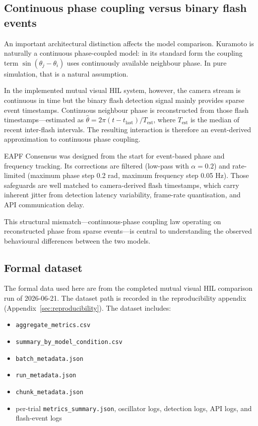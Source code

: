 \documentclass[11pt,a4paper]{article}
\begin{document}
\subsection{Continuous phase coupling versus binary flash events}

An important architectural distinction affects the model comparison. Kuramoto
is naturally a continuous phase-coupled model: in its standard form the
coupling term $\sin(\theta_j - \theta_i)$ uses continuously available
neighbour phase. In pure simulation, that is a natural assumption.

In the implemented mutual visual HIL system, however, the camera stream is
continuous in time but the binary flash detection signal mainly provides sparse
event timestamps. Continuous neighbour phase is reconstructed from those flash
timestamps---estimated as $\hat\theta = 2\pi (t - t_{\mathrm{last}}) /
T_{\mathrm{est}}$, where $T_{\mathrm{est}}$ is the median of recent inter-flash
intervals. The resulting interaction is therefore an event-derived
approximation to continuous phase coupling.

EAPF Consensus was designed from the start for event-based phase and frequency
tracking. Its corrections are filtered (low-pass with $\alpha=0.2$) and
rate-limited (maximum phase step 0.2 rad, maximum frequency step 0.05 Hz).
Those safeguards are well matched to camera-derived flash timestamps, which
carry inherent jitter from detection latency variability, frame-rate
quantisation, and API communication delay.

This structural mismatch---continuous-phase coupling law operating on
reconstructed phase from sparse events---is central to understanding the
observed behavioural differences between the two models.

\subsection{Formal dataset}

The formal data used here are from the completed mutual visual HIL comparison
run of 2026-06-21. The dataset path is recorded in the reproducibility
appendix (Appendix~\ref{sec:reproducibility}). The dataset includes:

\begin{itemize}
  \item \texttt{aggregate\_metrics.csv}
  \item \texttt{summary\_by\_model\_condition.csv}
  \item \texttt{batch\_metadata.json}
  \item \texttt{run\_metadata.json}
  \item \texttt{chunk\_metadata.json}
  \item per-trial \texttt{metrics\_summary.json}, oscillator logs, detection
        logs, API logs, and flash-event logs
\end{itemize}
\end{document}
